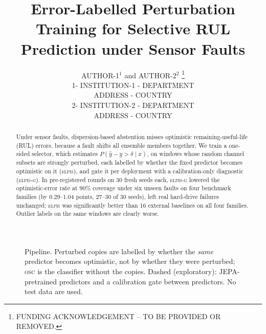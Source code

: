 \documentclass{esannV2}
\newcommand{\OSC}{\textsc{osc}}
\newcommand{\RPT}{\textsc{elpis}}
\newcommand{\AUTOD}{\textsc{elpis-g}}
\begin{document}
\title{Error-Labelled Perturbation Training for Selective RUL Prediction under Sensor Faults}

\author{AUTHOR-1$^1$ and AUTHOR-2$^2$
%
\thanks{FUNDING ACKNOWLEDGEMENT -- TO BE PROVIDED OR REMOVED.}
%
\vspace{.3cm}\\
%
1- INSTITUTION-1 - DEPARTMENT \\
ADDRESS - COUNTRY
%
\vspace{.1cm}\\
2- INSTITUTION-2 - DEPARTMENT \\
ADDRESS - COUNTRY\\
}

\maketitle

\begin{abstract}
Under sensor faults, dispersion-based abstention misses optimistic remaining-useful-life (RUL) errors, because a fault shifts all ensemble members together. We train a one-sided selector, which estimates $P(\hat y-y>\delta\mid x)$, on windows whose random channel subsets are strongly perturbed, each labelled by whether the fixed predictor becomes optimistic on it (\RPT), and gate it per deployment with a calibration-only diagnostic (\AUTOD). In pre-registered rounds on 30 fresh seeds each, \AUTOD{} lowered the optimistic-error rate at 90\% coverage under six unseen faults on four benchmark families (by 0.29--1.04 points, 27--30 of 30 seeds), left real hard-drive failures unchanged; \RPT{} was significantly better than 16 external baselines on all four families. Outlier labels on the same windows are clearly worse.
\end{abstract}

\begin{figure}[t]
\centering
\resizebox{\textwidth}{!}{}
\caption{Pipeline. Perturbed copies are labelled by whether the \emph{same} predictor becomes optimistic, not by whether they were perturbed; \OSC{} is the classifier without the copies. Dashed (exploratory): JEPA-pretrained predictors and a calibration gate between predictors. No test data are used.}
\label{fig:method}
\end{figure}
\end{document}

